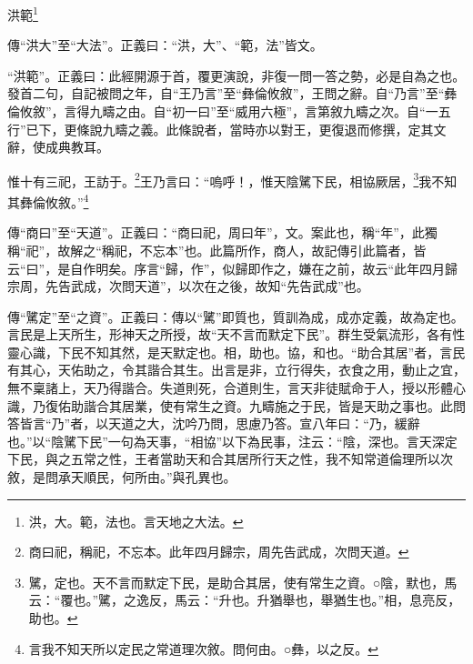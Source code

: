 洪範\footnote{洪，大。範，法也。言天地之大法。}


{\noindent\zhuan{}\fzbyks 傳“洪大”至“大法”。正義曰：“洪，大”、“範，法”皆文。 \par}

{\noindent\shu{}\fzkt “洪範”。正義曰：此經開源于首，覆更演說，非復一問一答之勢，必是自為之也。發首二句，自記被問之年，自“王乃言”至“彝倫攸敘”，王問之辭。自“乃言”至“彝倫攸敘”，言得九疇之由。自“初一曰”至“威用六極”，言第敘九疇之次。自“一五行”已下，更條說九疇之義。此條說者，當時亦以對王，更復退而修撰，定其文辭，使成典教耳。 \par}

惟十有三祀，王訪于。\footnote{商曰祀，稱祀，不忘本。此年四月歸宗，周先告武成，次問天道。}王乃言曰：“嗚呼！，惟天陰騭下民，相協厥居，\footnote{騭，定也。天不言而默定下民，是助合其居，使有常生之資。○陰，默也，馬云：“覆也。”騭，之逸反，馬云：“升也。升猶舉也，舉猶生也。”相，息亮反，助也。}我不知其彝倫攸敘。”\footnote{言我不知天所以定民之常道理次敘。問何由。○彝，以之反。}


{\noindent\zhuan{}\fzbyks 傳“商曰”至“天道”。正義曰：“商曰祀，周曰年”，文。案此也，稱“年”，此獨稱“祀”，故解之“稱祀，不忘本”也。此篇所作，商人，故記傳引此篇者，皆云“曰”，是自作明矣。序言“歸，作”，似歸即作之，嫌在之前，故云“此年四月歸宗周，先告武成，次問天道”，以次在之後，故知“先告武成”也。 \par}

{\noindent\zhuan{}\fzbyks 傳“騭定”至“之資”。正義曰：傳以“騭”即質也，質訓為成，成亦定義，故為定也。言民是上天所生，形神天之所授，故“天不言而默定下民”。群生受氣流形，各有性靈心識，下民不知其然，是天默定也。相，助也。協，和也。“助合其居”者，言民有其心，天佑助之，令其諧合其生。出言是非，立行得失，衣食之用，動止之宜，無不稟諸上，天乃得諧合。失道則死，合道則生，言天非徒賦命于人，授以形體心識，乃復佑助諧合其居業，使有常生之資。九疇施之于民，皆是天助之事也。此問答皆言“乃”者，以天道之大，沈吟乃問，思慮乃答。宣八年曰：“乃，緩辭也。”以“陰騭下民”一句為天事，“相協”以下為民事，注云：“陰，深也。言天深定下民，與之五常之性，王者當助天和合其居所行天之性，我不知常道倫理所以次敘，是問承天順民，何所由。”與孔異也。 \par}

